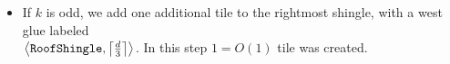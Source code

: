 \begin{itemize}
    \item If $k$ is odd, we add one additional tile to the rightmost shingle, with a west glue labeled\\ $\left\langle {\tt RoofShingle}, \ceil*{\frac{d}{3}} \right\rangle$.
    In this step $1 = O(1)$ tile was created.

\end{itemize}



\begin{figure}[H]
    \centering

\end{figure}
